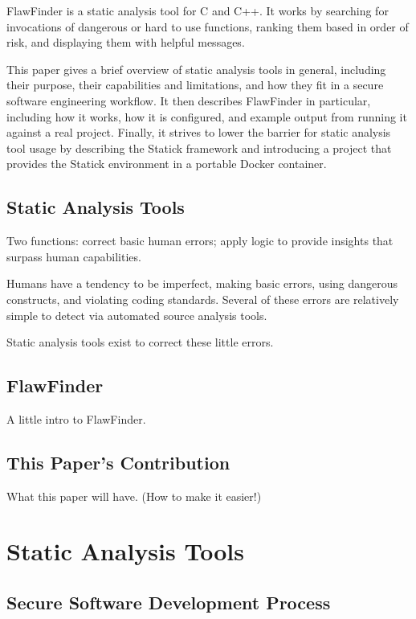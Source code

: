 \documentclass[journal]{IEEEtran}
\begin{document}
FlawFinder is a static analysis tool for C and C++. It works by searching for invocations of
dangerous or hard to use functions, ranking them based in order of risk, and displaying them with
helpful messages.

This paper gives a brief overview of static analysis tools in general, including their purpose,
their capabilities and limitations, and how they fit in a secure software engineering workflow. It
then describes FlawFinder in particular, including how it works, how it is configured, and example
output from running it against a real project. Finally, it strives to lower the barrier for static
analysis tool usage by describing the Statick framework and introducing a project that provides the
Statick environment in a portable Docker container.

\subsection{Static Analysis Tools}
Two functions: correct basic human errors; apply logic to provide insights that surpass human
capabilities.

Humans have a tendency to be imperfect, making basic errors, using dangerous constructs, and
violating coding standards. Several of these errors are relatively simple to detect via automated
source analysis tools.

Static analysis tools exist to correct these little errors.

\subsection{FlawFinder}
A little intro to FlawFinder.

\subsection{This Paper's Contribution}
What this paper will have. (How to make it easier!)


\section{Static Analysis Tools}

\subsection{Secure Software Development Process}
\end{document}
